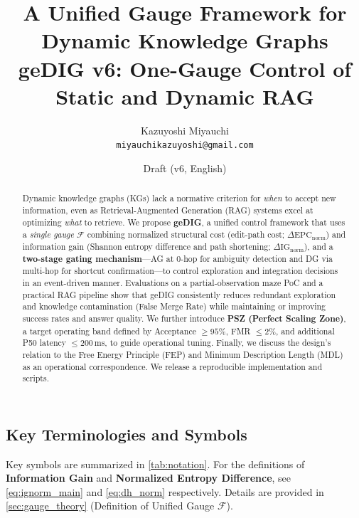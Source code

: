 \documentclass[12pt]{article}
\title{A Unified Gauge Framework for Dynamic Knowledge Graphs\\[0.3em]
  \large geDIG v6: One-Gauge Control of Static and Dynamic RAG}
\author{Kazuyoshi Miyauchi\\
  \small\texttt{miyauchikazuyoshi@gmail.com}}
\date{Draft (v6, English)}
\newcommand{\F}{\mathcal{F}}
\newcommand{\gednorm}{\Delta\mathrm{EPC}_{\mathrm{norm}}}
\newcommand{\ignorm}{\Delta\mathrm{IG}_{\mathrm{norm}}}
\begin{document}
\maketitle
\sloppy

\begin{abstract}
Dynamic knowledge graphs (KGs) lack a normative criterion for \emph{when} to accept new information, even as Retrieval-Augmented Generation (RAG) systems excel at optimizing \emph{what} to retrieve.
We propose \textbf{geDIG}, a unified control framework that uses a \emph{single gauge} $\F$ combining normalized structural cost (edit-path cost; $\gednorm$) and information gain (Shannon entropy difference and path shortening; $\ignorm$), and a \textbf{two-stage gating mechanism}---AG at 0-hop for ambiguity detection and DG via multi-hop for shortcut confirmation---to control exploration and integration decisions in an event-driven manner.
Evaluations on a partial-observation maze PoC and a practical RAG pipeline show that geDIG consistently reduces redundant exploration and knowledge contamination (False Merge Rate) while maintaining or improving success rates and answer quality.
We further introduce \textbf{PSZ (Perfect Scaling Zone)}, a target operating band defined by Acceptance $\ge 95\%$, FMR $\le 2\%$, and additional P50 latency $\le 200$\,ms, to guide operational tuning.
Finally, we discuss the design's relation to the Free Energy Principle (FEP) and Minimum Description Length (MDL) as an operational correspondence.
We release a reproducible implementation and scripts.
\end{abstract}

\subsection*{Key Terminologies and Symbols}
Key symbols are summarized in \cref{tab:notation}.
For the definitions of \textbf{Information Gain} and \textbf{Normalized Entropy Difference}, see \cref{eq:ignorm_main} and \cref{eq:dh_norm} respectively.
Details are provided in \cref{sec:gauge_theory} (Definition of Unified Gauge $\F$).
\end{document}
